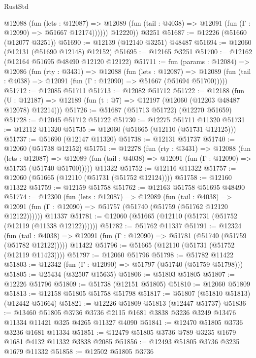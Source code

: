\begin{lexlean}{RustStd}
\begin{coremodule}
            @12088
              (fun (lets : @12087) =>
              @12089 (fun (tail : @4038) => @12091 (fun (Γ : @12090) => @51667 @12174))))))
        @12220))
    @3251
@51687 := @12226 (@51660 (@12077 @3251))
@51690 := @12139 (@12140 @3251) @48487
@51694 := @12060 (@12131 (@51690 @12148) @12152)
@51695 := @12165 @3251
@51700 := @12162 (@12164 @51695 @48490 @12120 @12122)
@51711 := fun (params : @12084) =>
  @12086
    (fun (rty : @3431) =>
    @12088
      (fun (lets : @12087) =>
      @12089 (fun (tail : @4038) => @12091 (fun (Γ : @12090) => @51667 (@51694 @51700)))))
@51712 := @12085 @51711
@51713 := @12082 @51712
@51722 := @12188
    (fun (U : @12187) => @12189 (fun (t : @7) => @12197 (@12060 (@12203 @48487 @12078) @12214)))
@51726 := @51687 (@51713 @51722) (@12270 @51659)
@51728 := @12045 @51712 @51722
@51730 := @12275 @51711 @11320
@51731 := @12112 @11320
@51735 := @12060 (@51665 (@12110 (@51731 @12125)))
@51737 := @51690 (@12147 @11320)
@51738 := @12131 @51737
@51740 := @12060 (@51738 @12152)
@51751 := @12278
    (fun (rty : @3431) =>
    @12088
      (fun (lets : @12087) =>
      @12089 (fun (tail : @4038) => @12091 (fun (Γ : @12090) => @51735 (@51740 @51700)))))
    @11322
@51752 := @12116 @11322
@51757 := @12060 (@51665 (@12110 (@51731 (@51752 @12124))))
@51758 := @12160 @11322
@51759 := @12159 @51758
@51762 := @12163 @51758 @51695 @48490
@51774 := @12300
    (fun (lets : @12087) =>
    @12089
      (fun (tail : @4038) =>
      @12091 (fun (Γ : @12090) => @51757 (@51740 (@51759 (@51762 @12120 @12122))))))
    @11337
@51781 := @12060 (@51665 (@12110 (@51731 (@51752 (@12119 (@11338 @12122))))))
@51782 := @51762 @11337
@51791 := @12324
    (fun (tail : @4038) => @12091 (fun (Γ : @12090) => @51781 (@51740 (@51759 (@51782 @12122)))))
    @11422
@51796 := @51665 (@12110 (@51731 (@51752 (@12119 @11423))))
@51797 := @12060 @51796
@51798 := @51782 @11422
@51803 := @12342 (fun (Γ : @12090) => @51797 (@51740 (@51759 @51798)))
@51805 := @25434 (@32507 @15635)
@51806 := @51803 @51805
@51807 := @12226 @51796
@51809 := @51738 (@12151 @51805)
@51810 := @12060 @51809
@51813 := @12158 @51805 @51758 @51798
@51817 := @51807 (@51810 @51813) (@12442 @51664)
@51821 := @12226 @51809 @51813 (@12447 @51737)
@51836 := @13460
    @51805
    @3736
    @3736
    @2115
    @1681
    @3838
    @3236
    @3249
    @13476
    @11334
    @11421
    @325
    @4265
    @11327
    @4090
@51841 := @12470 @51805 @3736 @3236 @1681 @11334
@51851 := @12479 @51805 @3736 @789 @3235 @1679 @1681 @4132 @11332 @3838 @2085
@51856 := @12493 @51805 @3736 @3235 @1679 @11332
@51858 := @12502 @51805 @3736

\end{coremodule}
\end{lexlean}

